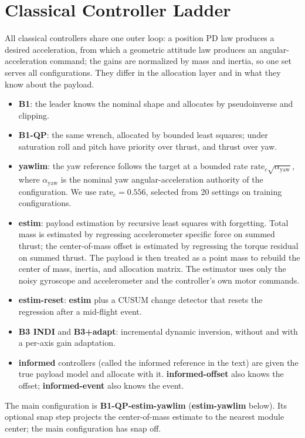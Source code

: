 \documentclass[conference]{IEEEtran}
\begin{document}
\section{Classical Controller Ladder}\label{sec:classical}
All classical controllers share one outer loop: a position PD law produces a desired acceleration, from which a geometric attitude law produces an angular-acceleration command; the gains are normalized by mass and inertia, so one set serves all configurations. %
They differ in the allocation layer and in what they know about the payload.
\begin{itemize}
\item \textbf{B1}: the leader knows the nominal shape and allocates by pseudoinverse and clipping. %
\item \textbf{B1-QP}: the same wrench, allocated by bounded least squares; under saturation roll and pitch have priority over thrust, and thrust over yaw. %
\item \textbf{yawlim}: the yaw reference follows the target at a bounded rate $\mathrm{rate}_c\sqrt{\alpha_{\mathrm{yaw}}}$, where $\alpha_{\mathrm{yaw}}$ is the nominal yaw angular-acceleration authority of the configuration. We use $\mathrm{rate}_c=0.556$, selected from 20 settings on training configurations. %
\item \textbf{estim}: payload estimation by recursive least squares with forgetting. Total mass is estimated by regressing accelerometer specific force on summed thrust; the center-of-mass offset is estimated by regressing the torque residual on summed thrust. The payload is then treated as a point mass to rebuild the center of mass, inertia, and allocation matrix. The estimator uses only the noisy gyroscope and accelerometer and the controller's own motor commands. %
\item \textbf{estim-reset}: \textbf{estim} plus a CUSUM change detector that resets the regression after a mid-flight event. %
\item \textbf{B3 INDI} and \textbf{B3+adapt}: incremental dynamic inversion, without and with a per-axis gain adaptation. %
\item \textbf{informed} controllers (called the informed reference in the text) are given the true payload model and allocate with it. \textbf{informed-offset} also knows the offset; \textbf{informed-event} also knows the event. %
\end{itemize}
The main configuration is \textbf{B1-QP-estim-yawlim} (\textbf{estim-yawlim} below).
Its optional snap step projects the center-of-mass estimate to the nearest module center; the main configuration has snap off.
\end{document}
